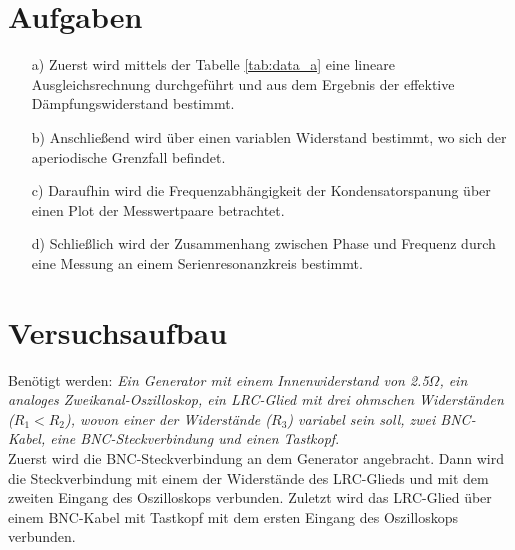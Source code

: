 
\section{Aufgaben}\justifying

 \begin{enumerate}

    \item[a)] \justifying Zuerst wird mittels der Tabelle \ref{tab:data_a} eine lineare
                          Ausgleichsrechnung durchgeführt und aus dem Ergebnis der effektive
                          Dämpfungswiderstand bestimmt.

    \item[b)] \justifying Anschließend wird über einen variablen Widerstand bestimmt,
                          wo sich der aperiodische Grenzfall befindet. 
  
    \item[c)] \justifying Daraufhin wird die Frequenzabhängigkeit
                          der Kondensatorspanung über einen Plot der Messwertpaare
                          betrachtet.
  
    \item[d)] \justifying Schließlich wird der Zusammenhang zwischen Phase und Frequenz
                          durch eine Messung an einem Serienresonanzkreis bestimmt.
    
  \end{enumerate}


\section{Versuchsaufbau}\justifying
Benötigt werden: \textit{Ein Generator mit einem Innenwiderstand von 2.5$\Omega$, 
ein analoges Zweikanal-Oszilloskop, ein LRC-Glied mit drei ohmschen Widerständen 
($R_1 < R_2$), wovon einer der Widerstände ($R_3$) variabel sein soll, 
zwei BNC-Kabel, eine BNC-Steckverbindung und einen Tastkopf}.\\
Zuerst wird die BNC-Steckverbindung an dem Generator angebracht. 
Dann wird die Steckverbindung mit einem der Widerstände des LRC-Glieds und mit dem zweiten 
Eingang des Oszilloskops verbunden.
Zuletzt wird das LRC-Glied über einem BNC-Kabel mit Tastkopf 
mit dem ersten Eingang des Oszilloskops verbunden.


